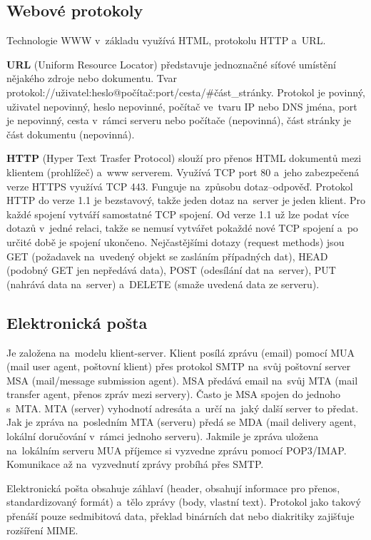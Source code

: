 \subsection{Webové protokoly}

Technologie WWW v~základu využívá HTML, protokolu HTTP a~URL.

\textbf{URL} (Uniform Resource Locator) představuje jednoznačné síťové umístění nějakého zdroje nebo dokumentu. Tvar protokol://uživatel:heslo@počítač:port/cesta/\#část\_stránky. Protokol je povinný, uživatel nepovinný, heslo nepovinné, počítač ve~tvaru IP nebo DNS jména, port je nepovinný, cesta v~rámci serveru nebo počítače (nepovinná), část stránky je část dokumentu (nepovinná).

\textbf{HTTP} (Hyper Text Trasfer Protocol) slouží pro přenos HTML dokumentů mezi klientem (prohlížeč) a~www serverem. Využívá TCP port 80 a~jeho zabezpečená verze HTTPS využívá TCP 443. Funguje na~způsobu dotaz--odpověď. Protokol HTTP do verze 1.1 je bezstavový, takže jeden dotaz na~server je jeden klient. Pro každé spojení vytváří samostatné TCP spojení. Od verze 1.1 už lze podat více dotazů v~jedné relaci, takže se nemusí vytvářet pokaždé nové TCP spojení a~po určité době je spojení ukončeno. Nejčastějšími dotazy (request methods) jsou GET (požadavek na~uvedený objekt se zasláním případných dat), HEAD (podobný GET jen nepředává data), POST (odesílání dat na~server), PUT (nahrává data na~server) a~DELETE (smaže uvedená data ze serveru).

\subsection{Elektronická pošta}

Je založena na~modelu klient-server. Klient posílá zprávu (email) pomocí MUA (mail user agent, poštovní klient) přes protokol SMTP na~svůj poštovní server MSA (mail/message submission agent). MSA předává email na~svůj MTA (mail transfer agent, přenos zpráv mezi servery). Často je MSA spojen do jednoho s~MTA. MTA (server) vyhodnotí adresáta a~určí na~jaký další server to předat. Jak je zpráva na~posledním MTA (serveru) předá se MDA (mail delivery agent, lokální doručování v~rámci jednoho serveru). Jakmile je zpráva uložena na~lokálním serveru MUA příjemce si vyzvedne zprávu pomocí POP3/IMAP. Komunikace až na~vyzvednutí zprávy probíhá přes SMTP.

Elektronická pošta obsahuje záhlaví (header, obsahují informace pro přenos, standardizovaný formát) a~tělo zprávy (body, vlastní text). Protokol jako takový přenáší pouze sedmibitová data, překlad binárních dat nebo diakritiky zajišťuje rozšíření MIME.

